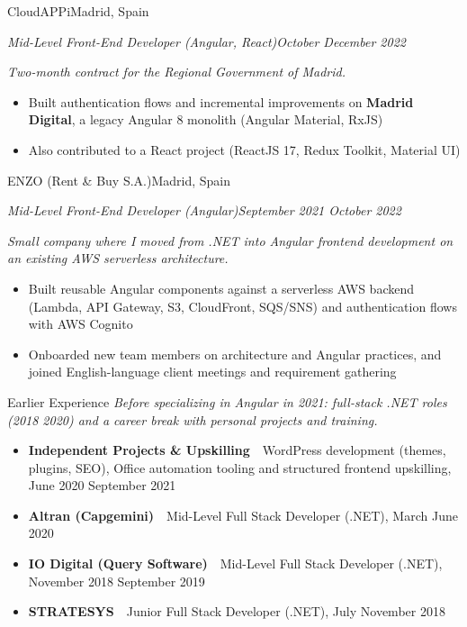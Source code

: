 \documentclass[10pt,a4paper]{article}
\newcommand{\job}[4]{%
  \vspace{5pt}%
  {\latosemibold\color{dark}#1\hfill{\latolight\small\color{light}#2}}\par
  {\itshape\small\color{mid}#3\hfill{\latolight\small\color{light}#4}}\par\vspace{2pt}%
}
\newcommand{\context}[1]{%
  {\latolight\itshape\small\color{mid}\hspace{0.8em}#1}\vspace{2pt}%
}
\newenvironment{items}{%
  \begin{itemize}[leftmargin=1.2em, itemsep=0pt, topsep=2pt, parsep=0pt, label={\color{light}\textbullet}]
    \normalsize\color{dark}
}{%
  \end{itemize}%
}
\begin{document}
\job{CloudAPPi}{Madrid, Spain}{Mid-Level Front-End Developer (Angular, React)}{October \textendash{} December 2022}
\context{Two-month contract for the Regional Government of Madrid.}
\begin{items}
  \item Built authentication flows and incremental improvements on \textbf{Madrid Digital}, a legacy Angular 8 monolith (Angular Material, RxJS)
  \item Also contributed to a React project (ReactJS 17, Redux Toolkit, Material UI)
\end{items}

\job{ENZO (Rent \& Buy S.A.)}{Madrid, Spain}{Mid-Level Front-End Developer (Angular)}{September 2021 \textendash{} October 2022}
\context{Small company where I moved from .NET into Angular frontend development on an existing AWS serverless architecture.}
\begin{items}
  \item Built reusable Angular components against a serverless AWS backend (Lambda, API Gateway, S3, CloudFront, SQS/SNS) and authentication flows with AWS Cognito
  \item Onboarded new team members on architecture and Angular practices, and joined English-language client meetings and requirement gathering
\end{items}

\vspace{4pt}
{\latosemibold\small\color{dark} Earlier Experience}\vspace{1pt}
\context{Before specializing in Angular in 2021: full-stack .NET roles (2018 \textendash{} 2020) and a career break with personal projects and training.}
\begin{items}
  \item \textbf{Independent Projects \& Upskilling} \,\textperiodcentered\, WordPress development (themes, plugins, SEO), Office automation tooling and structured frontend upskilling, June 2020 \textendash{} September 2021
  \item \textbf{Altran (Capgemini)} \,\textperiodcentered\, Mid-Level Full Stack Developer (.NET), March \textendash{} June 2020
  \item \textbf{IO Digital (Query Software)} \,\textperiodcentered\, Mid-Level Full Stack Developer (.NET), November 2018 \textendash{} September 2019
  \item \textbf{STRATESYS} \,\textperiodcentered\, Junior Full Stack Developer (.NET), July \textendash{} November 2018
\end{items}
\end{document}
